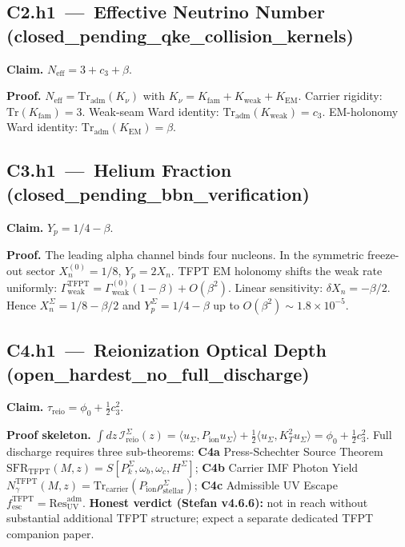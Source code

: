 \subsection*{C2.h1 \,---\, Effective Neutrino Number
\,(\textsf{closed\_pending\_qke\_collision\_kernels})}
\textbf{Claim.} \(N_{\mathrm{eff}}=3+c_3+\beta\).

\textbf{Proof.}
\(N_{\mathrm{eff}}=\mathrm{Tr}_{\mathrm{adm}}(K_\nu)\) with
\(K_\nu=K_{\mathrm{fam}}+K_{\mathrm{weak}}+K_{\mathrm{EM}}\).
Carrier rigidity: \(\mathrm{Tr}(K_{\mathrm{fam}})=3\).
Weak-seam Ward identity: \(\mathrm{Tr}_{\mathrm{adm}}(K_{\mathrm{weak}})=c_3\).
EM-holonomy Ward identity: \(\mathrm{Tr}_{\mathrm{adm}}(K_{\mathrm{EM}})=\beta\).

\subsection*{C3.h1 \,---\, Helium Fraction
\,(\textsf{closed\_pending\_bbn\_verification})}
\textbf{Claim.} \(Y_p=1/4-\beta\).

\textbf{Proof.}
The leading alpha channel binds four nucleons.  In the symmetric
freeze-out sector \(X_n^{(0)}=1/8\), \(Y_p=2X_n\).  TFPT EM holonomy
shifts the weak rate uniformly:
\(\Gamma_{\mathrm{weak}}^{\mathrm{TFPT}}=
\Gamma_{\mathrm{weak}}^{(0)}(1-\beta)+O(\beta^2)\).  Linear
sensitivity: \(\delta X_n=-\beta/2\).  Hence
\(X_n^\Sigma=1/8-\beta/2\) and \(Y_p^\Sigma=1/4-\beta\) up to
\(O(\beta^2)\sim 1.8\times 10^{-5}\).

\subsection*{C4.h1 \,---\, Reionization Optical Depth
\,(\textsf{open\_hardest\_no\_full\_discharge})}
\textbf{Claim.} \(\tau_{\mathrm{reio}}=\phi_0+\tfrac12 c_3^2\).

\textbf{Proof skeleton.}
\(\int dz\,\mathcal I_{\mathrm{reio}}^\Sigma(z) =
\langle u_\Sigma,P_{\mathrm{ion}}u_\Sigma\rangle+
\tfrac12\langle u_\Sigma,K_T^2 u_\Sigma\rangle =
\phi_0+\tfrac12 c_3^2\).  Full discharge requires three
sub-theorems:
\textbf{C4a} Press-Schechter Source Theorem
\(\mathrm{SFR}_{\mathrm{TFPT}}(M,z)
=S[P_k^\Sigma,\omega_b,\omega_c,H^\Sigma]\);
\textbf{C4b} Carrier IMF Photon Yield
\(N_\gamma^{\mathrm{TFPT}}(M,z)
=\mathrm{Tr}_{\mathrm{carrier}}(P_{\mathrm{ion}}\rho_{\mathrm{stellar}}^\Sigma)\);
\textbf{C4c} Admissible UV Escape
\(f_{\mathrm{esc}}^{\mathrm{TFPT}}=\mathrm{Res}_{\mathrm{UV}}^{\mathrm{adm}}\).
\textbf{Honest verdict (Stefan v4.6.6):} not in reach without
substantial additional TFPT structure; expect a separate dedicated
TFPT companion paper.

